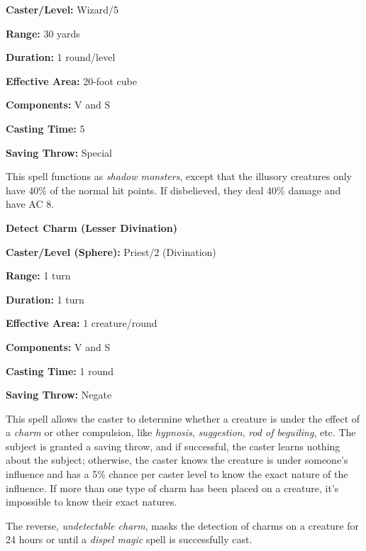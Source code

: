 \begin{multicols}{2}
\begin{minipage}{\columnwidth}
\noindent \textbf{Caster/Level:} Wizard/5

\noindent \textbf{Range:} 30 yards

\noindent \textbf{Duration:} 1 round/level

\noindent \textbf{Effective Area:} 20-foot cube

\noindent \textbf{Components:} V and S

\noindent \textbf{Casting Time:} 5

\noindent \textbf{Saving Throw:} Special

\end{minipage}

This spell functions as \textit{shadow monsters}, except that the illusory creatures only have 40\% of the normal hit points.  If disbelieved, they deal 40\% damage and have AC 8.  

\vspace{1em}

\noindent
\begin{minipage}{\columnwidth}

\noindent \textbf{Detect Charm (Lesser Divination)}

\noindent \textbf{Caster/Level (Sphere):} Priest/2 (Divination)

\noindent \textbf{Range:} 1 turn

\noindent \textbf{Duration:} 1 turn

\noindent \textbf{Effective Area:} 1 creature/round

\noindent \textbf{Components:} V and S

\noindent \textbf{Casting Time:} 1 round

\noindent \textbf{Saving Throw:} Negate

\end{minipage}

This spell allows the caster to determine whether a creature is under the effect of a \textit{charm} or other compulsion, like \textit{hypnosis}, \textit{suggestion}, \textit{rod of beguiling}, etc.  The subject is granted a saving throw, and if successful, the caster learns nothing about the subject; otherwise, the caster knows the creature is under someone's influence and has a 5\% chance per caster level to know the exact nature of the influence.  If more than one type of charm has been placed on a creature, it's impossible to know their exact natures.

The reverse, \textit{undetectable charm}, masks the detection of charms on a creature for 24 hours or until a \textit{dispel magic} spell is successfully cast.
 

\end{multicols}

